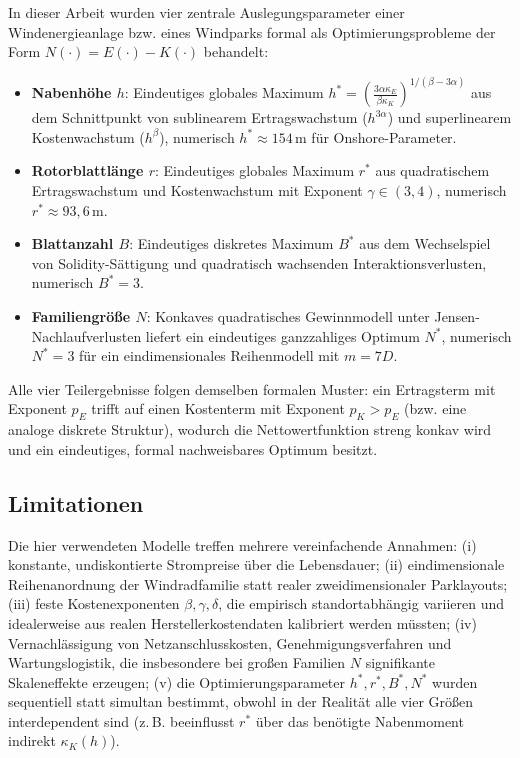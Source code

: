 ﻿\documentclass[a4paper,12pt]{article}
\theoremstyle{definition}
\begin{document}
In dieser Arbeit wurden vier zentrale Auslegungsparameter einer Windenergieanlage bzw. eines Windparks formal als Optimierungsprobleme der Form $N(\cdot)=E(\cdot)-K(\cdot)$ behandelt:

\begin{itemize}
	\item \textbf{Nabenhöhe $h$}: Eindeutiges globales Maximum $h^*=\left(\frac{3\alpha\kappa_E}{\beta\kappa_K}\right)^{1/(\beta-3\alpha)}$ aus dem Schnittpunkt von sublinearem Ertragswachstum ($h^{3\alpha}$) und superlinearem Kostenwachstum ($h^\beta$), numerisch $h^*\approx154\,\mathrm{m}$ für Onshore-Parameter.
	\item \textbf{Rotorblattlänge $r$}: Eindeutiges globales Maximum $r^*$ aus quadratischem Ertragswachstum und Kostenwachstum mit Exponent $\gamma\in(3,4)$, numerisch $r^*\approx93{,}6\,\mathrm{m}$.
	\item \textbf{Blattanzahl $B$}: Eindeutiges diskretes Maximum $B^*$ aus dem Wechselspiel von Solidity-Sättigung und quadratisch wachsenden Interaktionsverlusten, numerisch $B^*=3$.
	\item \textbf{Familiengröße $N$}: Konkaves quadratisches Gewinnmodell unter Jensen-Nachlaufverlusten liefert ein eindeutiges ganzzahliges Optimum $N^*$, numerisch $N^*=3$ für ein eindimensionales Reihenmodell mit $m=7D$.
\end{itemize}

Alle vier Teilergebnisse folgen demselben formalen Muster: ein Ertragsterm mit Exponent $p_E$ trifft auf einen Kostenterm mit Exponent $p_K > p_E$ (bzw. eine analoge diskrete Struktur), wodurch die Nettowertfunktion streng konkav wird und ein eindeutiges, formal nachweisbares Optimum besitzt.

\subsection{Limitationen}

Die hier verwendeten Modelle treffen mehrere vereinfachende Annahmen: (i) konstante, undiskontierte Strompreise über die Lebensdauer; (ii) eindimensionale Reihenanordnung der Windradfamilie statt realer zweidimensionaler Parklayouts; (iii) feste Kostenexponenten $\beta,\gamma,\delta$, die empirisch standortabhängig variieren und idealerweise aus realen Herstellerkostendaten kalibriert werden müssten; (iv) Vernachlässigung von Netzanschlusskosten, Genehmigungsverfahren und Wartungslogistik, die insbesondere bei großen Familien $N$ signifikante Skaleneffekte erzeugen; (v) die Optimierungsparameter $h^*, r^*, B^*, N^*$ wurden sequentiell statt simultan bestimmt, obwohl in der Realität alle vier Größen interdependent sind (z.\,B. beeinflusst $r^*$ über das benötigte Nabenmoment indirekt $\kappa_K(h)$).
\end{document}
